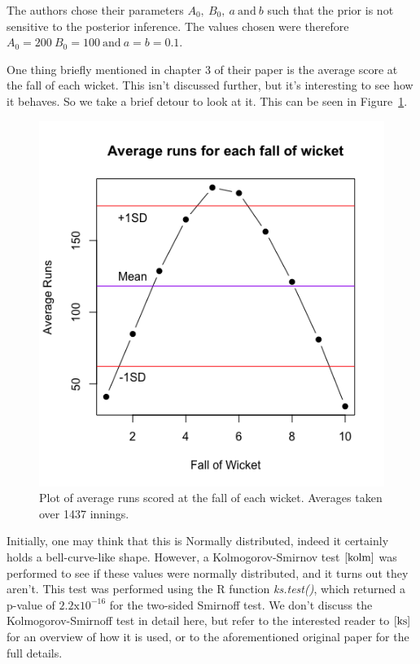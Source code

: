 The authors chose their parameters $A_0, \ B_0, \ a \ \text{and} \ b$ such that the prior is not sensitive to the posterior inference. The values chosen
were therefore $A_0=200 \ B_0=100 \ \text{and} \ a=b=0.1$.

One thing briefly mentioned in chapter 3 of their paper is the average score at the fall of each wicket. This isn't discussed further, but it's interesting to see how it behaves.
So we take a brief detour to look at it. This can be seen in Figure~\ref{avgrunsfow}.

\begin{figure}[h]
    \label{avgrunsfow}
    \centering
    \includegraphics[scale=0.6]{figures/avgrunsfow.png}
    \caption{Plot of average runs scored at the fall of each wicket. Averages taken over 1437 innings.}
\end{figure}

Initially, one may think that this is Normally distributed, indeed it certainly holds a bell-curve-like shape. However, a Kolmogorov-Smirnov test $\cite{kolm}$ was
performed to see if these values were normally distributed, and it turns out they aren't. This test was performed using the R function \textit{ks.test()}, which returned
a p-value of $2.2\text{x}10^{-16}$ for the two-sided Smirnoff test. We don't discuss the Kolmogorov-Smirnoff test in detail here, but refer to the interested reader to $\cite{ks}$
for an overview of how it is used, or to the aforementioned original paper for the full details.  \\

